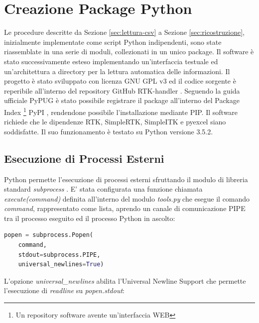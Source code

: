 \documentclass[a4paper,12pt, doubleside]{report}
\begin{document}
    \chapter{Creazione Package Python}
        \par
            Le procedure descritte da Sezione \ref{sec:lettura-csv} a Sezione \ref{sec:ricostruzione}, inizialmente implementate come script Python indipendenti, sono state riassemblate in una serie di moduli, collezionati in un unico package. Il software è stato successivamente esteso implementando un'interfaccia testuale ed un'architettura a directory per la lettura automatica delle informazioni. Il progetto è stato sviluppato con licenza GNU GPL v3 \cite{gpl-v3} ed il codice sorgente è reperibile all'interno del repository GitHub RTK-handler \cite{rtk-handler-source}. Seguendo la guida ufficiale PyPUG \cite{python-packaging} è stato possibile registrare il package all'interno del Package Index \footnote{Un repository software avente un'interfaccia WEB} PyPI \cite{rtk-handler-pypi}, rendendone possibile l'installazione mediante PIP. Il software richiede che le dipendenze RTK, SimpleRTK, SimpleITK e pyexcel siano soddisfatte. Il suo funzionamento è testato su Python versione 3.5.2.
            
        \section{Esecuzione di Processi Esterni}
        \label{esecuzione-processi-esterni}
            \par
                Python permette l'esecuzione di processi esterni sfruttando il modulo di libreria standard \textit{subprocess} \cite{python-subprocess}. E' stata configurata una funzione chiamata \textit{execute(command)} definita all'interno del modulo \textit{tools.py} che esegue il comando \textit{command}, rappresentato come lista, aprendo un canale di comunicazione PIPE tra il processo eseguito ed il processo Python in ascolto:
                        
                \begin{lstlisting}[language=python, frame=bt]
popen = subprocess.Popen(
    command,
    stdout=subprocess.PIPE,
    universal_newlines=True)
                \end{lstlisting}
                        
                L'opzione \textit{universal\_newlines} abilita l'Universal Newline Support \cite{python-UNS} che permette l'esecuzione di \textit{readline} su \textit{popen.stdout}:
\end{document}
